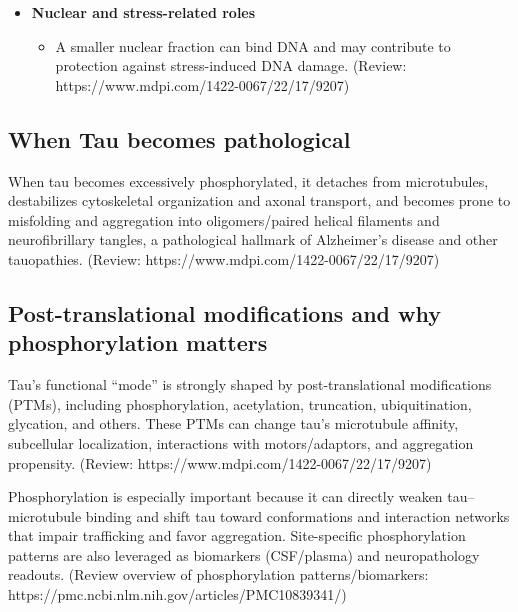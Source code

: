 \documentclass[
  letterpaper,
  DIV=11,
  numbers=noendperiod]{scrreprt}
\providecommand{\tightlist}{%
  \setlength{\itemsep}{0pt}\setlength{\parskip}{0pt}}
\begin{document}
\begin{itemize}
  \begin{itemize}
  \tightlist
  \item
    Interfaces with chaperones, proteasome, and autophagy machinery to
    regulate tau turnover and quality control. (Review:
    https://www.mdpi.com/1422-0067/22/17/9207)
  \end{itemize}
\item
  \textbf{Nuclear and stress-related roles}

  \begin{itemize}
  \tightlist
  \item
    A smaller nuclear fraction can bind DNA and may contribute to
    protection against stress-induced DNA damage. (Review:
    https://www.mdpi.com/1422-0067/22/17/9207)
  \end{itemize}
\end{itemize}

\subsection{When Tau becomes
pathological}\label{when-tau-becomes-pathological}

When tau becomes excessively phosphorylated, it detaches from
microtubules, destabilizes cytoskeletal organization and axonal
transport, and becomes prone to misfolding and aggregation into
oligomers/paired helical filaments and neurofibrillary tangles, a
pathological hallmark of Alzheimer's disease and other tauopathies.
(Review: https://www.mdpi.com/1422-0067/22/17/9207)

\subsection{Post-translational modifications and why phosphorylation
matters}\label{post-translational-modifications-and-why-phosphorylation-matters}

Tau's functional ``mode'' is strongly shaped by post-translational
modifications (PTMs), including phosphorylation, acetylation,
truncation, ubiquitination, glycation, and others. These PTMs can change
tau's microtubule affinity, subcellular localization, interactions with
motors/adaptors, and aggregation propensity. (Review:
https://www.mdpi.com/1422-0067/22/17/9207)

Phosphorylation is especially important because it can directly weaken
tau--microtubule binding and shift tau toward conformations and
interaction networks that impair trafficking and favor aggregation.
Site-specific phosphorylation patterns are also leveraged as biomarkers
(CSF/plasma) and neuropathology readouts. (Review overview of
phosphorylation patterns/biomarkers:
https://pmc.ncbi.nlm.nih.gov/articles/PMC10839341/)
\end{document}
